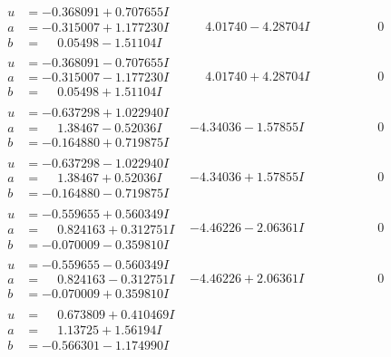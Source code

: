 \documentclass[1p]{elsarticle_modified}
\theoremstyle{definition}
\begin{document}
$$\begin{array}{c|c|c}
\begin{aligned}
u &= -0.368091 + 0.707655 I \\
a &= -0.315007 + 1.177230 I \\
b &= \phantom{-}0.05498 - 1.51104 I\end{aligned}
 & \phantom{-}4.01740 - 4.28704 I & \phantom{-0.000000 } 0 \\ \hline\begin{aligned}
u &= -0.368091 - 0.707655 I \\
a &= -0.315007 - 1.177230 I \\
b &= \phantom{-}0.05498 + 1.51104 I\end{aligned}
 & \phantom{-}4.01740 + 4.28704 I & \phantom{-0.000000 } 0 \\ \hline\begin{aligned}
u &= -0.637298 + 1.022940 I \\
a &= \phantom{-}1.38467 - 0.52036 I \\
b &= -0.164880 + 0.719875 I\end{aligned}
 & -4.34036 - 1.57855 I & \phantom{-0.000000 } 0 \\ \hline\begin{aligned}
u &= -0.637298 - 1.022940 I \\
a &= \phantom{-}1.38467 + 0.52036 I \\
b &= -0.164880 - 0.719875 I\end{aligned}
 & -4.34036 + 1.57855 I & \phantom{-0.000000 } 0 \\ \hline\begin{aligned}
u &= -0.559655 + 0.560349 I \\
a &= \phantom{-}0.824163 + 0.312751 I \\
b &= -0.070009 - 0.359810 I\end{aligned}
 & -4.46226 - 2.06361 I & \phantom{-0.000000 } 0 \\ \hline\begin{aligned}
u &= -0.559655 - 0.560349 I \\
a &= \phantom{-}0.824163 - 0.312751 I \\
b &= -0.070009 + 0.359810 I\end{aligned}
 & -4.46226 + 2.06361 I & \phantom{-0.000000 } 0 \\ \hline\begin{aligned}
u &= \phantom{-}0.673809 + 0.410469 I \\
a &= \phantom{-}1.13725 + 1.56194 I \\
b &= -0.566301 - 1.174990 I\end{aligned}

\end{array}$$
\end{document}
